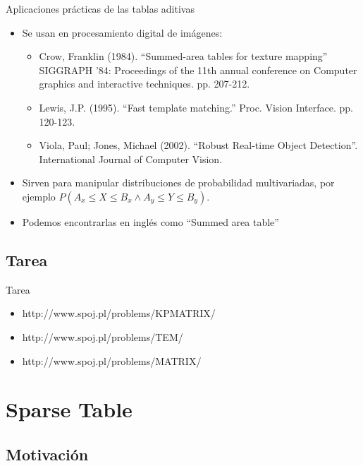 \documentclass{beamer}
\begin{document}
\begin{frame}{Aplicaciones prácticas de las tablas aditivas}
  \begin{itemize}
     \item Se usan en procesamiento digital de imágenes:
        \begin{itemize}
            \footnotesize
            \item Crow, Franklin (1984). ``Summed-area tables for texture mapping'' SIGGRAPH '84: Proceedings of the 11th annual conference on Computer graphics and interactive techniques. pp. 207-212.
            \item Lewis, J.P. (1995). ``Fast template matching.'' Proc. Vision Interface. pp. 120-123.
            \item Viola, Paul; Jones, Michael (2002). ``Robust Real-time Object Detection''. International Journal of Computer Vision.
        \end{itemize}
     \item Sirven para manipular distribuciones de probabilidad multivariadas, por ejemplo $P(A_x \leq X \leq B_x \land A_y \leq Y \leq B_y)$.
     \item Podemos encontrarlas en inglés como ``Summed area table''
  \end{itemize}
\end{frame}

\subsection{Tarea}
\begin{frame}{Tarea}
  \begin{itemize}
     \item http://www.spoj.pl/problems/KPMATRIX/
     \item http://www.spoj.pl/problems/TEM/
     \item http://www.spoj.pl/problems/MATRIX/
  \end{itemize}
\end{frame}

\section{Sparse Table}

\subsection{Motivación}
\end{document}
